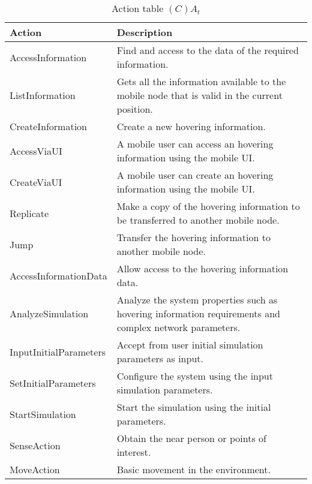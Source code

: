 \begin{table}[H]
	\centering
	\begin{tabular}{|p{4cm}|p{8cm}|}
			\hline
			\textbf{Action} & \textbf{Description} \\
			\hline
			AccessInformation & Find and access to the data of the required
			information. \\
			\hline
			ListInformation & Gets all the information available to the mobile node
			that is valid in the current position.\\
			\hline
			CreateInformation & Create a new hovering information. \\
			\hline
			AccessViaUI & A mobile user can access an hovering information using the
			mobile UI. \\
			\hline
			CreateViaUI & A mobile user can create an hovering information using the
			mobile UI. \\
			\hline
			Replicate & Make a copy of the hovering information to be transferred to
			another mobile node. \\
			\hline
			Jump & Transfer the hovering information to another mobile node. \\
			\hline
			AccessInformationData & Allow access to the hovering information data. \\
			\hline
			AnalyzeSimulation & Analyze the system properties such as hovering
			information requirements and complex network parameters. \\
			\hline
			InputInitialParameters & Accept from user initial simulation parameters
			as input. \\
			\hline
			SetInitialParameters & Configure the system using the input simulation
			parameters. \\
			\hline
			StartSimulation & Start the simulation using the initial parameters. \\
			\hline
			SenseAction & Obtain the near person or points of interest. \\
			\hline
			MoveAction & Basic movement in the environment. \\
			\hline
		\end{tabular}
	\caption{Action table $(C)A_t$}
	\label{tab:cat}
\end{table}

